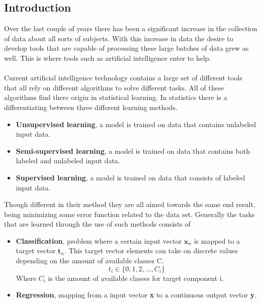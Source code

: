 \documentclass[12pt]{article}
\begin{document}
\subsection{Introduction}

Over the last couple of years there has been a significant increase in the collection of data about all sorts of subjects. With this increase in data the desire to develop tools that are capable of processing these large batches of data grew as well. This is where tools such as artificial intelligence enter to help. 
\\
\\
Current artificial intelligence technology contains a large set of different tools that all rely on different algorithms to solve different tasks. All of these algorithms find there origin in statistical learning. In statistics there is a differentiating between three different learning methods.\cite{Bishop2013, Haykin2008, Budumu, P.Murphy1991, TrevorHastie2009}
\begin{itemize}
	\item \textbf{Unsupervised learning}, a model is trained on data that contains unlabeled input data.
	\item \textbf{Semi-supervised learning}, a model is trained on data that contains both labeled and unlabeled input data.
	\item \textbf{Supervised learning}, a model is trained on data that consists of labeled input data.
\end{itemize}
Though different in their method they are all aimed towards the same end result, being minimizing some error function related to the data set. Generally the tasks that are learned through the use of such methods consists of 
\begin{itemize}
	\item \textbf{Classification}, problem where a certain input vector $\textbf{x}_n$ is mapped to a target vector $\textbf{t}_n$. This target vector elements can take on discrete values depending on the amount of available classes  C.
	\begin{equation*}
		t_i \in \{0,1,2,\dots, C_i\}
	\end{equation*}
	Where $C_i$ is the amount of available classes for target component i.   
	\item \textbf{Regression}, mapping from a input vector \textbf{x} to a continuous output vector \textbf{y}. 
\end{itemize} 
\\
\\
\end{document}
